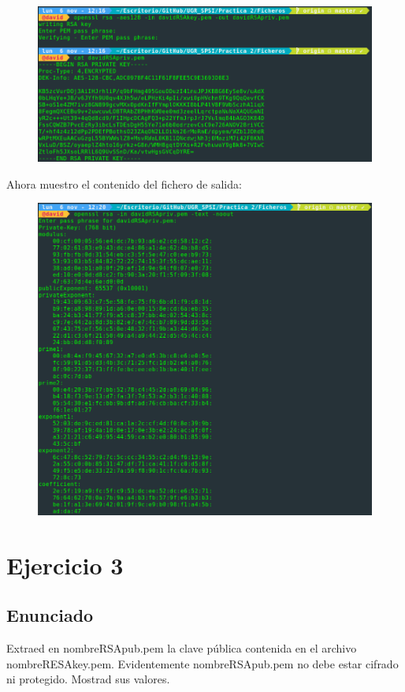 \documentclass[10pt,a4paper,spanish]{report}
\begin{document}
\begin{figure}[!hbp]
 \centering  \includegraphics[width=1\textwidth]{./Imagenes/2_0.png}
\end{figure}

\newpage
\noindent
Ahora muestro el contenido del fichero de salida:

\begin{figure}[!hbp]
 \centering  \includegraphics[width=1\textwidth]{./Imagenes/2_1.png}
\end{figure}

\chapter{Ejercicio 3}

\section{Enunciado}
\noindent
Extraed en nombreRSApub.pem la clave pública contenida en el archivo nombreRESAkey.pem. Evidentemente nombreRSApub.pem no debe estar cifrado ni protegido. Mostrad sus valores.
\end{document}
